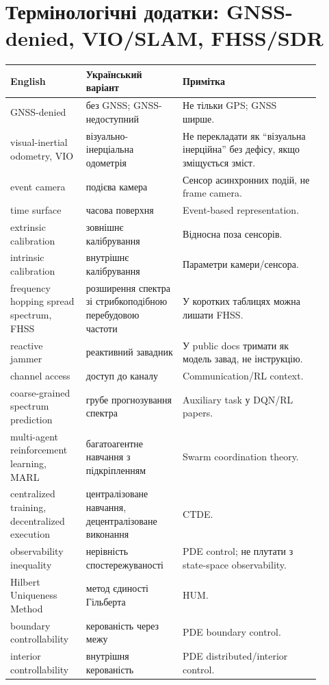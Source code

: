 \chapter{Термінологічні додатки: GNSS-denied, VIO/SLAM, FHSS/SDR}
\begin{longtable}{L{0.22\linewidth}L{0.28\linewidth}L{0.40\linewidth}}
\toprule
English & Український варіант & Примітка \\
\midrule
GNSS-denied & без GNSS; GNSS-недоступний & Не тільки GPS; GNSS ширше. \\
visual-inertial odometry, VIO & візуально-інерціальна одометрія & Не перекладати як ``візуальна інерційна'' без дефісу, якщо зміщується зміст. \\
event camera & подієва камера & Сенсор асинхронних подій, не frame camera. \\
time surface & часова поверхня & Event-based representation. \\
extrinsic calibration & зовнішнє калібрування & Відносна поза сенсорів. \\
intrinsic calibration & внутрішнє калібрування & Параметри камери/сенсора. \\
frequency hopping spread spectrum, FHSS & розширення спектра зі стрибкоподібною перебудовою частоти & У коротких таблицях можна лишати FHSS. \\
reactive jammer & реактивний завадник & У public docs тримати як модель завад, не інструкцію. \\
channel access & доступ до каналу & Communication/RL context. \\
coarse-grained spectrum prediction & грубе прогнозування спектра & Auxiliary task у DQN/RL papers. \\
multi-agent reinforcement learning, MARL & багатоагентне навчання з підкріпленням & Swarm coordination theory. \\
centralized training, decentralized execution & централізоване навчання, децентралізоване виконання & CTDE. \\
observability inequality & нерівність спостережуваності & PDE control; не плутати з state-space observability. \\
Hilbert Uniqueness Method & метод єдиності Гільберта & HUM. \\
boundary controllability & керованість через межу & PDE boundary control. \\
interior controllability & внутрішня керованість & PDE distributed/interior control. \\
\bottomrule
\end{longtable}
